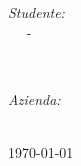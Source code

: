 \begin{titlepage}
    \begin{minipage}{0.4\textwidth}
        \begin{flushleft} \large
            \emph{Studente:}\\
            \nomeStudente\ \textsc{\cognomeStudente\ } - \matricolaStudente
        \end{flushleft}
    \end{minipage}
    ~
    \begin{minipage}{0.4\textwidth}
        \begin{flushright} \large
            \emph{Azienda:} \\
            \ragioneSocAzienda
        \end{flushright}
    \end{minipage}\\[1.5cm]


    {\large \today}

    \vfill

\end{titlepage}
